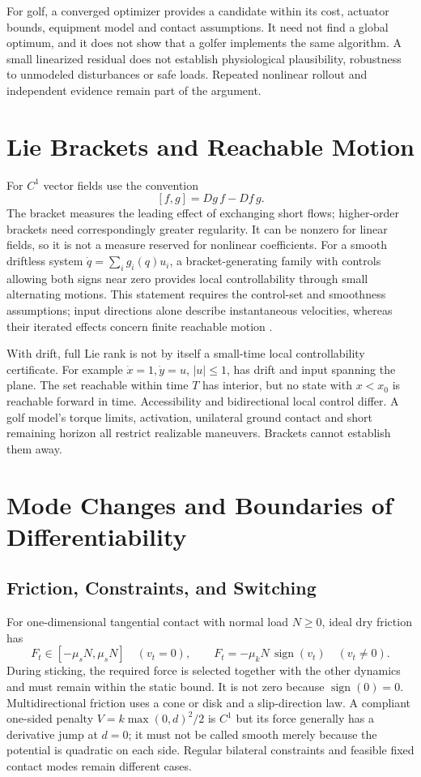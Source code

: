 For golf, a converged optimizer provides a candidate within its cost, actuator bounds,
equipment model and contact assumptions. It need not find a global optimum, and it does
not show that a golfer implements the same algorithm. A small linearized residual does
not establish physiological plausibility, robustness to unmodeled disturbances or safe
loads. Repeated nonlinear rollout and independent evidence remain part of the argument.

\section{Lie Brackets and Reachable Motion}
\label{rem:ch1:lie-brackets}

For $C^1$ vector fields use the convention
\[
[f,g]=Dg\,f-Df\,g.
\]
The bracket measures the leading effect of exchanging short flows; higher-order brackets
need correspondingly greater regularity. It can be nonzero for linear fields, so it is
not a measure reserved for nonlinear coefficients. For a smooth driftless system
$\dot q=\sum_i g_i(q)u_i$, a bracket-generating family with controls allowing both signs
near zero provides local controllability through small alternating motions. This statement
requires the control-set and smoothness assumptions; input directions alone describe
instantaneous velocities, whereas their iterated effects concern finite reachable motion
\cite{ModernRoboticsControllabilityFoundations}.

With drift, full Lie rank is not by itself a small-time local controllability certificate.
For example $\dot x=1,\dot y=u$, $|u|\leq1$, has drift and input spanning the plane.
The set reachable within time $T$ has interior, but no state with $x<x_0$ is reachable
forward in time. Accessibility and bidirectional local control differ. A golf model's
torque limits, activation, unilateral ground contact and short remaining horizon all
restrict realizable maneuvers. Brackets cannot establish them away.

\section{Mode Changes and Boundaries of Differentiability}

\subsection{Friction, Constraints, and Switching}

For one-dimensional tangential contact with normal load $N\geq0$, ideal dry friction has
\[
F_t\in[-\mu_sN,\mu_sN]\quad(v_t=0),\qquad
F_t=-\mu_kN\,\operatorname{sign}(v_t)\quad(v_t\ne0).
\]
During sticking, the required force is selected together with the other dynamics and must
remain within the static bound. It is not zero because $\operatorname{sign}(0)=0$.
Multidirectional friction uses a cone or disk and a slip-direction law. A compliant
one-sided penalty $V=k\max(0,d)^2/2$ is $C^1$ but its force generally has a derivative
jump at $d=0$; it must not be called smooth merely because the potential is quadratic
on each side. Regular bilateral constraints and feasible fixed contact modes remain
different cases.

